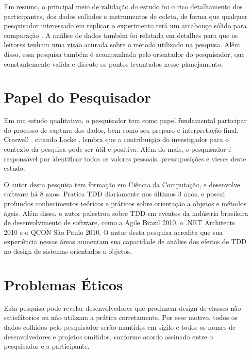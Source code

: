 Em resumo, o principal meio de validação do estudo foi o rico detalhamento dos
participantes, dos dados colhidos e instrumentos de coleta, de forma
que qualquer pesquisador interessado em replicar o experimento terá um
arcabouço sólido para comparação \cite{merriam-1998}. A análise de
dados também foi relatada em detalhes para que os leitores tenham uma visão
acurada sobre o método utilizado na pesquisa. 
Além disso, essa pesquisa também é acompanhada pelo orientador do pesquisador,
que constantemente valida e discute os pontos levantados nesse planejamento.

\section{Papel do Pesquisador}
\label{sec:planejamento-papel}

Em um estudo qualitativo, o pesquisador tem como papel fundamental participar do 
processo de captura dos dados, bem como seu preparo e interpretação final.
Creswell \cite{creswell}, citando Locke \cite{locke}, lembra
que a contribuição do investigador para o contexto da pesquisa pode ser útil e
positiva. Além do mais, o pesquisador é responsável por
identificar todos os valores pessoais, pressuposições e vieses deste estudo.

O autor desta pesquisa tem formação em Ciência da Computação, e desenvolve software há 8
anos. Pratica TDD diariamente nos últimos 3 anos, e possui profundos
conhecimentos teóricos e práticos sobre orientação a objetos e métodos ágeis.
Além disso, o autor palestrou sobre TDD em eventos da indústria brasileira
de desenvolvimento de software, como a Agile Brazil 2010, o .NET Architects
2010 e o QCON São Paulo 2010. O autor desta pesquisa acredita que sua experiência nessas
áreas aumentam sua capacidade de análise dos efeitos de TDD no design de sistemas 
orientados a objetos.

\section{Problemas Éticos}
\label{sec:planejamento-etica}

Esta pesquisa pode revelar desenvolvedores que produzem design de classes não
satisfátorios ou não utilizam a prática corretamente.
Por esse motivo, todos os dados colhidos pelo pesquisador serão mantidos em
sigilo e todos os nomes de desenvolvedores e projetos omitidos, conforme acordo 
assinado entre o pesquisador e a participante.

